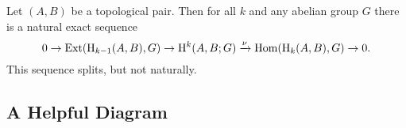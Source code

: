 \begin{theorem}\label{thm:univ_coef}
  Let $(A,B)$ be a topological pair.
  Then for all $k$ and any abelian group $G$ there is a natural exact sequence
  \[ 0\to\mathrm{Ext}(\mathrm{H}_{k-1}(A, B), G)\to \mathrm{H}^k(A, B; G)\xrightarrow{\nu} \mathrm{Hom}(\mathrm{H}_k(A, B), G)\to 0.\]
  This sequence splits, but not naturally.
\end{theorem}

\subsection{A Helpful Diagram}

